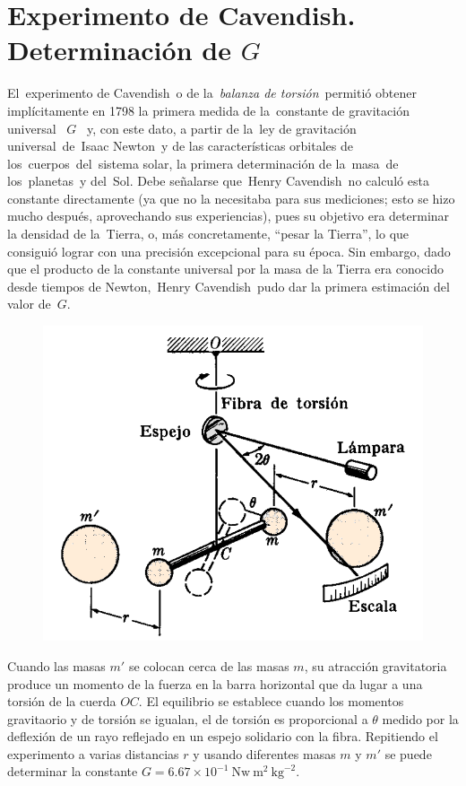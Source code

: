 \section{Experimento de Cavendish. Determinación de $G$}

El experimento de Cavendish o de la \emph{balanza de torsión} permitió obtener implícitamente en 1798 la primera medida de la constante de gravitación universal  $G$  y, con este dato, a partir de la ley de gravitación universal de Isaac Newton y de las características orbitales de los cuerpos del sistema solar, la primera determinación de la masa de los planetas y del Sol. Debe señalarse que Henry Cavendish no calculó esta constante directamente (ya que no la necesitaba para sus mediciones; esto se hizo mucho después, aprovechando sus experiencias), pues su objetivo era determinar la densidad de la Tierra, o, más concretamente, ``pesar la Tierra'', lo que consiguió lograr con una precisión excepcional para su época. Sin embargo, dado que el producto de la constante universal por la masa de la Tierra era conocido desde tiempos de Newton, Henry Cavendish pudo dar la primera estimación del valor de $G$.

\begin{figure}[H]
	\centering
	\includegraphics[width=.6\textwidth]{imagenes/imagenes14/T14IM12.png}
\end{figure}

Cuando las masas $m'$ se colocan cerca de las masas $m$, su atracción gravitatoria produce un momento de la fuerza en la barra horizontal que da lugar a una torsión de la cuerda $OC$. El equilibrio se establece cuando los momentos gravitaorio y de torsión se igualan, el de torsión es proporcional a $\theta$ medido por la deflexión de un rayo reflejado en un espejo solidario con la fibra. Repitiendo el experimento a varias distancias $r$ y usando diferentes masas $m$ y $m'$ se puede determinar la constante $G=6.67 \times 10^{-1}\ \mathrm{Nw} \ \mathrm{m}^2 \ \mathrm{kg}^{-2}$.


